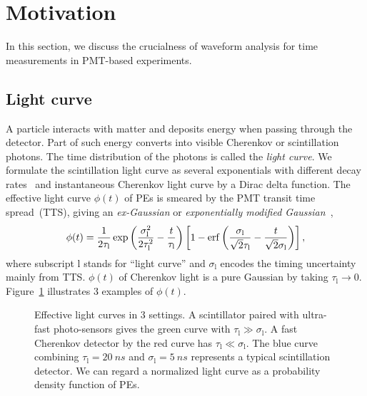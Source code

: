 \section{Motivation}
\label{sec:toyMC}

In this section, we discuss the crucialness of waveform analysis for time measurements in PMT-based experiments.

\subsection{Light curve}
A particle interacts with matter and deposits energy when passing through the detector. Part of such energy converts into visible Cherenkov or scintillation photons. The time distribution of the photons is called the \textit{light curve}.  We formulate the scintillation light curve as several exponentials with different decay rates~\cite{rebber_particle_2021} and instantaneous Cherenkov light curve by a Dirac delta function.  The effective light curve $\phi(t)$ of PEs is smeared by the PMT transit time spread~(TTS), giving an \textit{ex-Gaussian} or \textit{exponentially modified Gaussian}~\cite{li_separation_2016},
\begin{align}
    \phi(t) = \frac{1}{2\tau_\mathrm{l}} \exp\left(\frac{\sigma_\mathrm{l}^2}{2\tau_\mathrm{l}^2}-\frac{t}{\tau_\mathrm{l}}\right) \left[1 - \operatorname{erf}\left( \frac{\sigma_\mathrm{l}}{\sqrt{2}\tau_\mathrm{l}} - \frac{t}{\sqrt{2}\sigma_\mathrm{l}} \right)\right],
    \label{eq:time-pro}
\end{align}
where subscript $\mathrm{l}$ stands for ``light curve'' and $\sigma_\mathrm{l}$ encodes the timing uncertainty mainly from TTS. $\phi(t)$ of Cherenkov light is a pure Gaussian by taking $\tau_\mathrm{l} \rightarrow 0$. Figure~\ref{fig:time-pro} illustrates 3 examples of $\phi(t)$. 

\begin{figure}[!htb]
  \centering
  \resizebox{0.5\textwidth}{!}{}
  \caption{\label{fig:time-pro} Effective light curves in 3 settings.  A scintillator paired with ultra-fast photo-sensors gives the green curve with $\tau_\mathrm{l} \gg \sigma_\mathrm{l}$.  A fast Cherenkov detector by the red curve has $\tau_\mathrm{l} \ll \sigma_\mathrm{l}$.  The blue curve combining $\tau_\mathrm{l}=\SI{20}{ns}$ and $\sigma_\mathrm{l}=\SI{5}{ns}$ represents a typical scintillation detector.  We can regard a normalized light curve as a probability density function of PEs.}
\end{figure}


